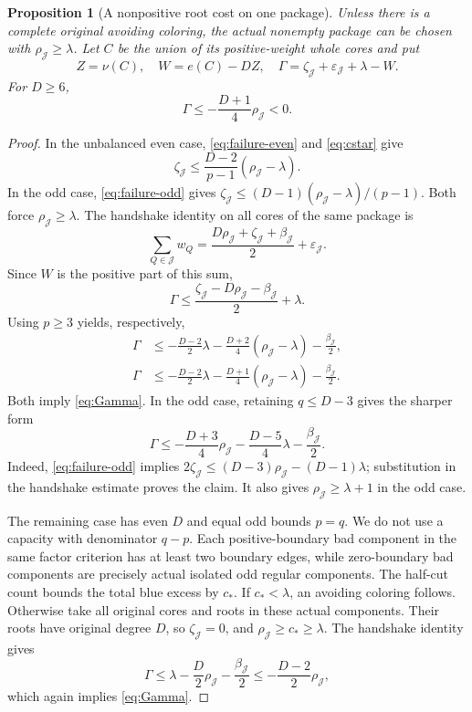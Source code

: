 \documentclass[11pt,a4paper]{article}
\newtheorem{proposition}[theorem]{Proposition}
\theoremstyle{definition}
\begin{document}
\begin{proposition}[A nonpositive root cost on one package]\label{prop:pack}
Unless there is a complete original avoiding coloring, the actual nonempty package can be chosen with $\rho_{\mathcal J}\ge\lambda$. Let $C$ be the union of its positive-weight whole cores and put
\[
Z=\nu(C),\quad W=e(C)-DZ,\quad
\Gamma=\zeta_{\mathcal J}+\varepsilon_{\mathcal J}+\lambda-W.
\]
For $D\ge6$,
\begin{equation}\label{eq:Gamma}
\Gamma\le-\frac{D+1}{4}\rho_{\mathcal J}<0.
\end{equation}
\end{proposition}
\begin{proof}
In the unbalanced even case, \eqref{eq:failure-even} and \eqref{eq:cstar} give
\[
\zeta_{\mathcal J}\le\frac{D-2}{p-1}(\rho_{\mathcal J}-\lambda).
\]
In the odd case, \eqref{eq:failure-odd} gives
$\zeta_{\mathcal J}\le(D-1)(\rho_{\mathcal J}-\lambda)/(p-1)$.
Both force $\rho_{\mathcal J}\ge\lambda$.
The handshake identity on all cores of the same package is
\[
\sum_{Q\in\mathcal J}w_Q
=\frac{D\rho_{\mathcal J}+\zeta_{\mathcal J}+\beta_{\mathcal J}}2
+\varepsilon_{\mathcal J}.
\]
Since $W$ is the positive part of this sum,
\[
\Gamma\le
\frac{\zeta_{\mathcal J}-D\rho_{\mathcal J}-\beta_{\mathcal J}}2+\lambda.
\]
Using $p\ge3$ yields, respectively,
\begin{align*}
\Gamma&\le-\frac{D-2}{2}\lambda
-\frac{D+2}{4}(\rho_{\mathcal J}-\lambda)-\frac{\beta_{\mathcal J}}2,\\
\Gamma&\le-\frac{D-2}{2}\lambda
-\frac{D+1}{4}(\rho_{\mathcal J}-\lambda)-\frac{\beta_{\mathcal J}}2.
\end{align*}
Both imply \eqref{eq:Gamma}. In the odd case, retaining $q\le D-3$ gives the sharper form
\begin{equation}\label{eq:Gamma-odd-sharp}
\Gamma\le-\frac{D+3}{4}\rho_{\mathcal J}
-\frac{D-5}{4}\lambda-\frac{\beta_{\mathcal J}}2.
\end{equation}
Indeed, \eqref{eq:failure-odd} implies
$2\zeta_{\mathcal J}\le(D-3)\rho_{\mathcal J}-(D-1)\lambda$; substitution in the handshake estimate proves the claim. It also gives $\rho_{\mathcal J}\ge\lambda+1$ in the odd case.

The remaining case has even $D$ and equal odd bounds $p=q$. We do not use a capacity with denominator $q-p$. Each positive-boundary bad component in the same factor criterion has at least two boundary edges, while zero-boundary bad components are precisely actual isolated odd regular components. The half-cut count bounds the total blue excess by $c_*$. If $c_*<\lambda$, an avoiding coloring follows. Otherwise take all original cores and roots in these actual components. Their roots have original degree $D$, so $\zeta_{\mathcal J}=0$, and $\rho_{\mathcal J}\ge c_*\ge\lambda$. The handshake identity gives
\[
\Gamma\le\lambda-\frac D2\rho_{\mathcal J}-\frac{\beta_{\mathcal J}}2
\le-\frac{D-2}{2}\rho_{\mathcal J},
\]
which again implies \eqref{eq:Gamma}.
\end{proof}
\end{document}
